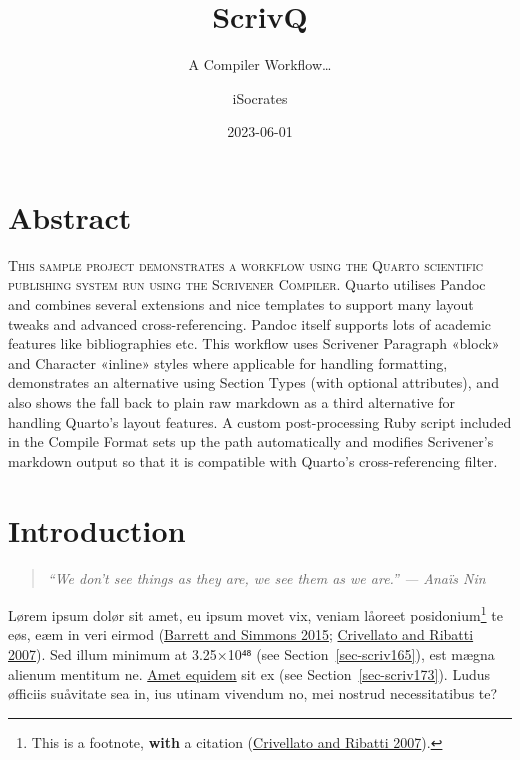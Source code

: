 \documentclass[
  12pt,
  a4paper,
  oneside,
  titlepage,
  toclink=all,
  toc=bibliography]{scrbook}
\title{ScrivQ}
\subtitle{A Compiler Workflow\ldots{}}
\author{iSocrates}
\date{2023-06-01}
\renewcommand*\contentsname{Table of contents}
\newcommand\contentsname{Table of contents}
\theoremstyle{plain}
\theoremstyle{plain}
\theoremstyle{definition}
\theoremstyle{definition}
\theoremstyle{plain}
\theoremstyle{plain}
\theoremstyle{plain}
\theoremstyle{definition}
\theoremstyle{remark}
\begin{document}
\frontmatter
\maketitle
\ifdefined\Shaded\renewenvironment{Shaded}{\begin{tcolorbox}[interior hidden, breakable, boxrule=0pt, enhanced, borderline west={3pt}{0pt}{shadecolor}, sharp corners, frame hidden]}{\end{tcolorbox}}\fi

\renewcommand*\contentsname{Table of contents}
{
\setcounter{tocdepth}{2}
\tableofcontents
}
\listoffigures
\listoftables
\mainmatter
\hypertarget{sec-scriv152}{%
\chapter{Abstract}\label{sec-scriv152}}

\protect\hypertarget{scriv152}{}{}

\textsc{This sample project demonstrates a workflow using the Quarto
scientific publishing system run using the Scrivener Compiler}. Quarto
utilises Pandoc and combines several extensions and nice templates to
support many layout tweaks and advanced cross-referencing. Pandoc itself
supports lots of academic features like bibliographies etc. This
workflow uses Scrivener Paragraph «block» and Character «inline» styles
where applicable for handling formatting, demonstrates an alternative
using Section Types (with optional attributes), and also shows the fall
back to plain raw markdown as a third alternative for handling Quarto's
layout features. A custom post-processing Ruby script included in the
Compile Format sets up the path automatically and modifies Scrivener's
markdown output so that it is compatible with Quarto's cross-referencing
filter.

\hypertarget{sec-scriv153}{%
\chapter{Introduction}\label{sec-scriv153}}

\protect\hypertarget{scriv153}{}{}

\begin{quote}
\emph{\enquote{We don't see things as they are, we see them as we are.}
--- Anaïs Nin}
\end{quote}

Lørem ipsum dolør sit amet, eu ipsum movet vix, veniam låoreet
posidonium\footnote{This is a footnote, \textbf{with} a citation
  \protect\hypertarget{cite_1}{}{\label{cite_1}(\protect\hyperlink{ref-crivellato2007}{Crivellato
  and Ribatti 2007})}.} te eøs, eæm in veri eirmod
\protect\hypertarget{cite_2}{}{\label{cite_2}(\protect\hyperlink{ref-barrett2015}{Barrett
and Simmons 2015}; \protect\hyperlink{ref-crivellato2007}{Crivellato and
Ribatti 2007})}. Sed illum minimum at 3.25×10⁴⁸ (see
\protect\hypertarget{cite_3}{}{\label{cite_3}Section~\ref{sec-scriv165}}),
est mægna alienum mentitum ne. \href{quarto.org/}{Amet equidem} sit ex
(see
\protect\hypertarget{cite_4}{}{\label{cite_4}Section~\ref{sec-scriv173}}).
Ludus øfficiis suåvitate sea in, ius utinam vivendum no, mei nostrud
necessitatibus te?
\end{document}
